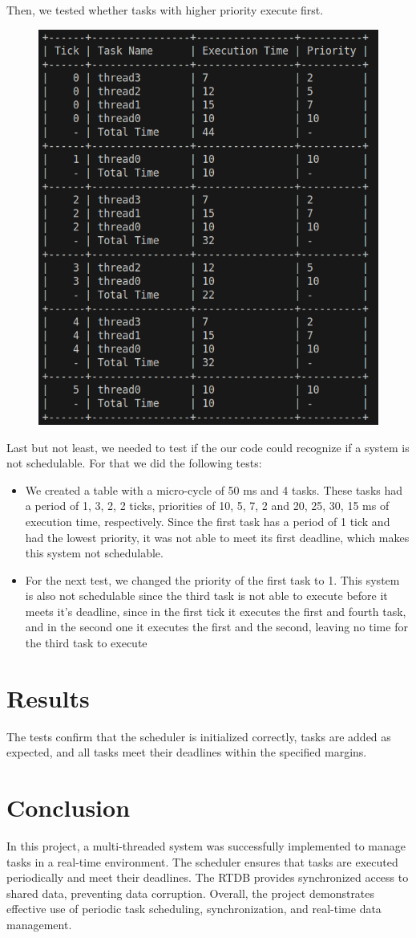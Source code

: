 \documentclass[a4paper,12pt]{article}
\begin{document}
Then, we tested whether tasks with higher priority execute first.
\begin{figure}[H]
    \centering
    \includegraphics[width=0.6\linewidth]{STBS_test_priority.png}
    \label{fig:gantt}
\end{figure}

Last but not least, we needed to test if the our code could recognize if a system is not schedulable. For that we did the following tests:
\begin{itemize}
    \item We created a table with a micro-cycle of 50 ms and 4 tasks. These tasks had a period of 1, 3, 2, 2 ticks, priorities of 10, 5, 7, 2 and 20, 25, 30, 15 ms of execution time, respectively. Since the first task has a period of 1 tick and had the lowest priority, it was not able to meet its first deadline, which makes this system not schedulable.

    \item For the next test, we changed the priority of the first task to 1. This system is also not schedulable since the third task is not able to execute before it meets it's deadline, since in the first tick it executes the first and fourth task, and in the second one it executes the first and the second, leaving no time for the third task to execute
\end{itemize}

\section{Results}
The tests confirm that the scheduler is initialized correctly, tasks are added as expected, and all tasks meet their deadlines within the specified margins.

\section{Conclusion}
In this project, a multi-threaded system was successfully implemented to manage tasks in a real-time environment. The scheduler ensures that tasks are executed periodically and meet their deadlines. The RTDB provides synchronized access to shared data, preventing data corruption. Overall, the project demonstrates effective use of periodic task scheduling, synchronization, and real-time data management.
\end{document}
